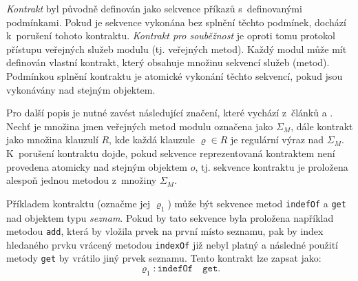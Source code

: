 \textit{Kontrakt} \cite{cite:contract0} byl původně definován jako sekvence příkazů s~definovanými podmínkami. Pokud je sekvence vykonána bez splnění těchto podmínek, dochází k~porušení tohoto kontraktu. \textit{Kontrakt pro souběžnost} \cite{cite:contract01} je oproti tomu protokol přístupu veřejných služeb modulu (tj. veřejných metod). Každý modul může mít definován vlastní kontrakt, který obsahuje množinu sekvencí služeb (metod). Podmínkou splnění kontraktu je atomické vykonání těchto sekvencí, pokud jsou vykonávány nad stejným objektem.

Pro další popis je nutné zavést následující značení, které vychází z~článků \cite{cite:contract1} a \cite{cite:contract2}. Nechť je množina jmen veřejných metod modulu označena jako $\Sigma_M$, dále kontrakt jako množina klauzulí $R$, kde každá klauzule $\varrho \in R$ je regulární výraz nad $\Sigma_M$. K~porušení kontraktu dojde, pokud sekvence reprezentovaná kontraktem není provedena atomicky nad stejným objektem $o$, tj. sekvence kontraktu je proložena alespoň jednou metodou z~množiny $\Sigma_M$.

Příkladem kontraktu (označme jej $\varrho_1$) může být sekvence metod \texttt{indefOf} a \texttt{get} nad objektem typu \textit{seznam}. Pokud by tato sekvence byla proložena například metodou \texttt{add}, která by vložila prvek na první místo seznamu, pak by index hledaného prvku vrácený metodou \texttt{indexOf} již nebyl platný a následné použití metody \texttt{get} by vrátilo jiný prvek seznamu. Tento kontrakt lze zapsat jako: $$\varrho_1: \texttt{indefOf} \quad \texttt{get}.$$



